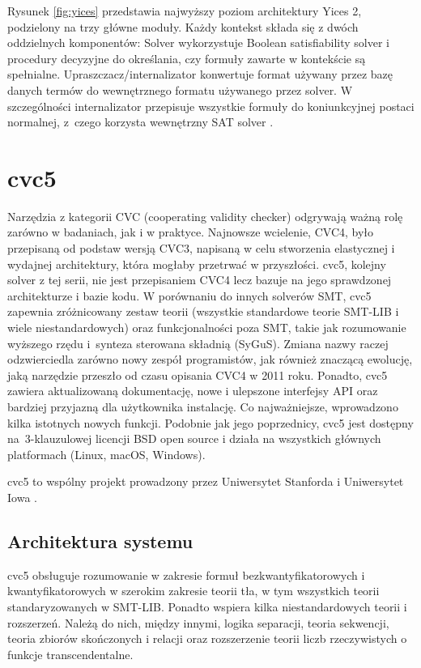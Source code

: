 Rysunek \ref{fig:yices} przedstawia najwyższy poziom architektury Yices 2, podzielony na trzy główne moduły. Każdy kontekst składa się z dwóch oddzielnych komponentów: Solver wykorzystuje Boolean satisfiability solver i procedury decyzyjne do określania, czy formuły zawarte w kontekście są spełnialne. Upraszczacz/internalizator konwertuje format używany przez bazę danych termów do wewnętrznego formatu używanego przez solver. W szczególności
internalizator przepisuje wszystkie formuły do koniunkcyjnej postaci normalnej, z~czego korzysta wewnętrzny SAT solver \cite{yices2.2}.


\section{cvc5}
Narzędzia z kategorii CVC (cooperating validity checker) odgrywają ważną rolę zarówno w badaniach, jak i w praktyce. Najnowsze wcielenie, CVC4, było przepisaną od podstaw wersją CVC3, napisaną w celu stworzenia elastycznej i wydajnej architektury, która mogłaby przetrwać w przyszłości. cvc5, kolejny solver z tej serii, nie jest
przepisaniem CVC4 lecz bazuje na jego sprawdzonej architekturze i bazie kodu. W porównaniu do innych solverów SMT, cvc5 zapewnia zróżnicowany zestaw teorii (wszystkie standardowe teorie SMT-LIB i wiele niestandardowych) oraz funkcjonalności poza SMT, takie jak rozumowanie wyższego rzędu i~synteza sterowana składnią (SyGuS). Zmiana nazwy raczej odzwierciedla zarówno nowy zespół programistów, jak również znaczącą ewolucję, jaką narzędzie przeszło od czasu opisania CVC4 w 2011 roku. Ponadto, cvc5 zawiera aktualizowaną dokumentację, nowe i ulepszone interfejsy API oraz bardziej przyjazną dla użytkownika instalację. Co najważniejsze, wprowadzono kilka istotnych nowych funkcji. Podobnie jak jego poprzednicy, cvc5 jest dostępny na~3-klauzulowej licencji BSD open source i działa na wszystkich głównych platformach (Linux, macOS, Windows).

cvc5 to wspólny projekt prowadzony przez Uniwersytet Stanforda i Uniwersytet Iowa \cite{BarbosaBBKLMMMN22}.

\subsection{Architektura systemu}

cvc5 obsługuje rozumowanie w zakresie formuł bezkwantyfikatorowych i kwantyfikatorowych w szerokim zakresie teorii tła, w tym wszystkich teorii standaryzowanych w SMT-LIB. Ponadto wspiera kilka niestandardowych teorii i rozszerzeń. Należą do nich, między innymi, logika separacji, teoria sekwencji, teoria zbiorów skończonych i relacji oraz rozszerzenie teorii liczb rzeczywistych o funkcje transcendentalne. 

